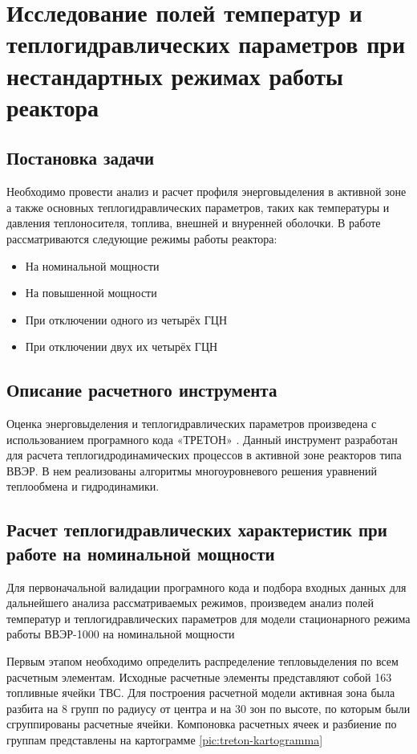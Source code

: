 \section{Исследование полей температур и теплогидравлических параметров при нестандартных режимах работы реактора}

\subsection{Постановка задачи}
Необходимо провести анализ и расчет профиля энерговыделения в активной зоне а также основных теплогидравлических параметров, таких как температуры и давления теплоносителя, топлива, внешней и внуренней оболочки. В работе рассматриваются следующие режимы работы реактора:
\begin{itemize}
    \item На номинальной мощности
    \item На повышенной мощности
    \item При отключении одного из четырёх ГЦН
    \item При отключении двух их четырёх ГЦН
\end{itemize}



\subsection{Описание расчетного инструмента}
Оценка энерговыделения и теплогидравлических параметров произведена с использованием програмного кода «ТРЕТОН» \cite{Маслов5глава}. 
Данный инструмент разработан для расчета теплогидродинамических процессов в активной зоне реакторов типа ВВЭР. В нем реализованы алгоритмы многоуровневого решения уравнений теплообмена и гидродинамики.


\subsection{Расчет теплогидравлических характеристик при работе на номинальной мощности}
Для первоначальной валидации програмного кода и подбора входных данных для дальнейшего анализа рассматриваемых режимов, произведем анализ полей температур и теплогидравлических параметров для модели стационарного режима работы ВВЭР-1000 на номинальной мощности

Первым этапом необходимо определить распределение тепловыделения по всем расчетным элементам. Исходные расчетные элементы представляют собой 163 топливные ячейки ТВС. Для построения расчетной модели активная зона была разбита на 8 групп по радиусу от центра и на 30 зон по высоте, по которым были сгруппированы расчетные ячейки. Компоновка расчетных ячеек и разбиение по группам представлены на картограмме \ref{pic:treton-kartogramma}


